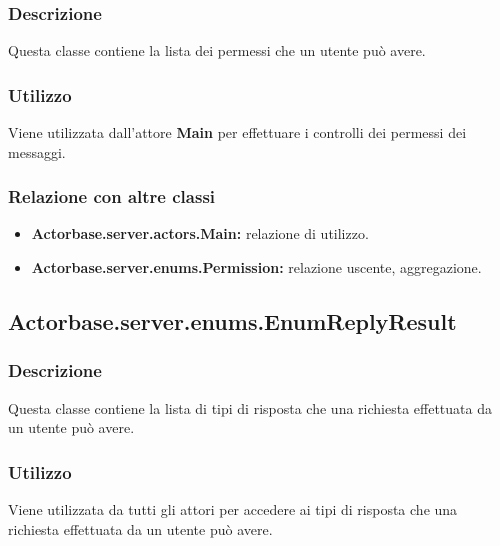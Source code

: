 \documentclass[a4paper]{article}
\begin{document}
			\subsubsection{Descrizione}
				Questa classe contiene la lista dei permessi che un utente può avere.
				
			\subsubsection{Utilizzo}
				Viene utilizzata dall'attore \textbf{Main} per effettuare i controlli dei permessi dei messaggi. 				
				
			\subsubsection{Relazione con altre classi}
				\begin{itemize}
					\item \textbf{Actorbase.server.actors.Main:} relazione di utilizzo.
					\item \textbf{Actorbase.server.enums.Permission:} relazione uscente, aggregazione.
				\end{itemize}
				
		\subsection{Actorbase.server.enums.EnumReplyResult}
			\subsubsection{Descrizione}
				Questa classe contiene la lista di tipi di risposta che una richiesta effettuata da un utente può avere.
			\subsubsection{Utilizzo}
				Viene utilizzata da tutti gli attori per accedere ai tipi di risposta che una richiesta effettuata da un utente può avere.
				
\end{document}
